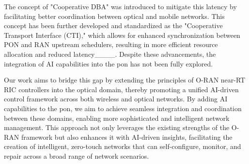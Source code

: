 The concept of "Cooperative DBA" was introduced to mitigate this latency by facilitating better coordination between optical and mobile networks. This concept has been further developed and standardized as the "Cooperative Transport Interface (CTI)," which allows for enhanced synchronization between PON and RAN upstream schedulers, resulting in more efficient resource allocation and reduced latency____. Despite these advancements, the integration of AI capabilities into the \ac{pon} has not been fully explored.

Our work aims to bridge this gap by extending the principles of O-RAN near-RT RIC controllers into the optical domain, thereby promoting a unified AI-driven control framework across both wireless and optical networks. By adding AI capabilities to the \ac{pon}, we aim to achieve seamless integration and coordination between these domains, enabling more sophisticated and intelligent network management. This approach not only leverages the existing strengths of the O-RAN framework but also enhances it with AI-driven insights, facilitating the creation of intelligent, zero-touch networks that can self-configure, monitor, and repair across a broad range of network scenarios.

